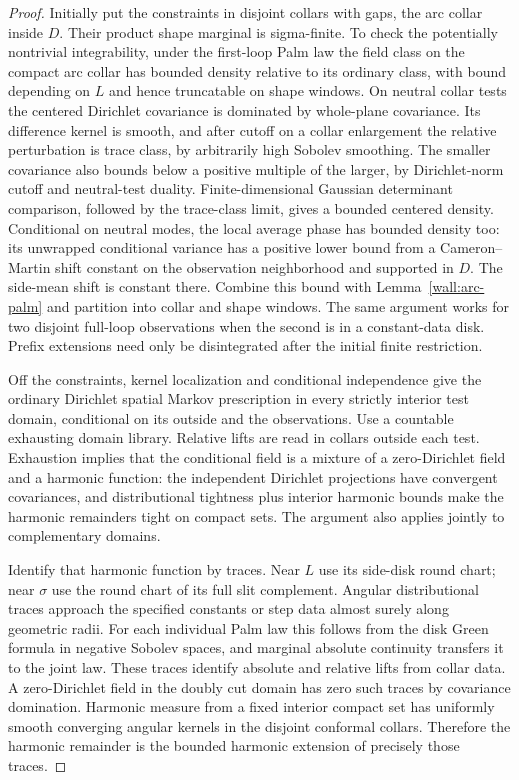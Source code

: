 \begin{proof}
Initially put the constraints in disjoint collars with gaps, the arc collar inside $D$.  Their product shape marginal is sigma-finite.  To check the potentially nontrivial integrability, under the first-loop Palm law the field class on the compact arc collar has bounded density relative to its ordinary class, with bound depending on $L$ and hence truncatable on shape windows.  On neutral collar tests the centered Dirichlet covariance is dominated by whole-plane covariance.  Its difference kernel is smooth, and after cutoff on a collar enlargement the relative perturbation is trace class, by arbitrarily high Sobolev smoothing.  The smaller covariance also bounds below a positive multiple of the larger, by Dirichlet-norm cutoff and neutral-test duality.  Finite-dimensional Gaussian determinant comparison, followed by the trace-class limit, gives a bounded centered density.  Conditional on neutral modes, the local average phase has bounded density too: its unwrapped conditional variance has a positive lower bound from a Cameron--Martin shift constant on the observation neighborhood and supported in $D$.  The side-mean shift is constant there.  Combine this bound with Lemma~\ref{wall:arc-palm} and partition into collar and shape windows.  The same argument works for two disjoint full-loop observations when the second is in a constant-data disk.  Prefix extensions need only be disintegrated after the initial finite restriction.

Off the constraints, kernel localization and conditional independence give the ordinary Dirichlet spatial Markov prescription in every strictly interior test domain, conditional on its outside and the observations.  Use a countable exhausting domain library.  Relative lifts are read in collars outside each test.  Exhaustion implies that the conditional field is a mixture of a zero-Dirichlet field and a harmonic function: the independent Dirichlet projections have convergent covariances, and distributional tightness plus interior harmonic bounds make the harmonic remainders tight on compact sets.  The argument also applies jointly to complementary domains.

Identify that harmonic function by traces.  Near $L$ use its side-disk round chart; near $\sigma$ use the round chart of its full slit complement.  Angular distributional traces approach the specified constants or step data almost surely along geometric radii.  For each individual Palm law this follows from the disk Green formula in negative Sobolev spaces, and marginal absolute continuity transfers it to the joint law.  These traces identify absolute and relative lifts from collar data.  A zero-Dirichlet field in the doubly cut domain has zero such traces by covariance domination.  Harmonic measure from a fixed interior compact set has uniformly smooth converging angular kernels in the disjoint conformal collars.  Therefore the harmonic remainder is the bounded harmonic extension of precisely those traces.


\end{proof}
